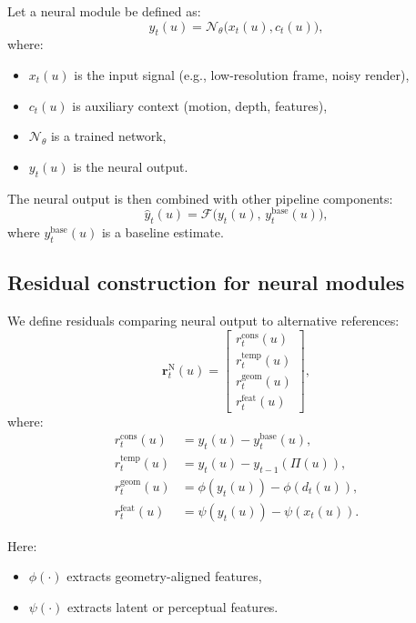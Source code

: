 \documentclass[11pt]{article}
\theoremstyle{definition}
\theoremstyle{plain}
\begin{document}
Let a neural module be defined as:
\begin{equation}
y_t(u) = \mathcal{N}_\theta\bigl(x_t(u), c_t(u)\bigr),
\end{equation}
where:
\begin{itemize}[leftmargin=1.5em]
    \item $x_t(u)$ is the input signal (e.g., low-resolution frame, noisy render),
    \item $c_t(u)$ is auxiliary context (motion, depth, features),
    \item $\mathcal{N}_\theta$ is a trained network,
    \item $y_t(u)$ is the neural output.
\end{itemize}

The neural output is then combined with other pipeline components:
\begin{equation}
\hat{y}_t(u)=\mathcal{F}\bigl(y_t(u),\,y^{\mathrm{base}}_t(u)\bigr),
\end{equation}
where $y^{\mathrm{base}}_t(u)$ is a baseline estimate.


\subsection{Residual construction for neural modules}

We define residuals comparing neural output to alternative references:
\begin{equation}
\mathbf r^{\mathrm{N}}_t(u)=
\begin{bmatrix}
r^{\mathrm{cons}}_t(u)\\
r^{\mathrm{temp}}_t(u)\\
r^{\mathrm{geom}}_t(u)\\
r^{\mathrm{feat}}_t(u)
\end{bmatrix},
\end{equation}
where:
\begin{align}
r^{\mathrm{cons}}_t(u) &= y_t(u) - y^{\mathrm{base}}_t(u),\\
r^{\mathrm{temp}}_t(u) &= y_t(u) - y_{t-1}(\Pi(u)),\\
r^{\mathrm{geom}}_t(u) &= \phi(y_t(u)) - \phi(d_t(u)),\\
r^{\mathrm{feat}}_t(u) &= \psi(y_t(u)) - \psi(x_t(u)).
\end{align}

Here:
\begin{itemize}[leftmargin=1.5em]
    \item $\phi(\cdot)$ extracts geometry-aligned features,
    \item $\psi(\cdot)$ extracts latent or perceptual features.
\end{itemize}
\end{document}
